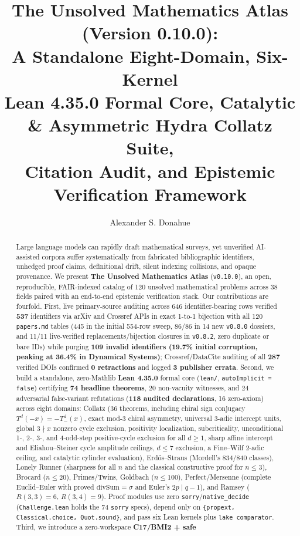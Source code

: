 \documentclass[11pt,reqno]{amsart}
\title[The Unsolved Mathematics Atlas (Version 0.10.0): Six-Kernel Formal Core \& Hydra]{%
  The Unsolved Mathematics Atlas (Version 0.10.0):\\
  A Standalone Eight-Domain, Six-Kernel\\
  Lean 4.35.0 Formal Core, Catalytic \& Asymmetric Hydra Collatz Suite,\\
  Citation Audit, and Epistemic Verification Framework}
\author{Alexander S. Donahue}
\theoremstyle{plain}
\theoremstyle{definition}
\newcommand{\code}[1]{{\upshape\nolinkurl{#1}}}
\begin{document}
\begin{abstract}
Large language models can rapidly draft mathematical surveys, yet unverified AI-assisted
corpora suffer systematically from fabricated bibliographic identifiers, unhedged proof claims,
definitional drift, silent indexing collisions, and opaque provenance. We present
\textbf{The Unsolved Mathematics Atlas} (\texttt{v0.10.0}), an open, reproducible, FAIR-indexed
catalog of 120 unsolved mathematical problems across 38 fields paired with an end-to-end
epistemic verification stack. Our contributions are fourfold.
First, live primary-source auditing across 646 identifier-bearing rows verified \textbf{537}
identifiers via arXiv and Crossref APIs in exact 1-to-1 bijection with all 120 \code{papers.md}
tables (445 in the initial 554-row sweep, 86/86 in 14 new \texttt{v0.8.0} dossiers, and 11/11
live-verified replacements/bijection closures in \texttt{v0.8.2}, zero duplicate or bare IDs)
while purging \textbf{109 invalid identifiers (19.7\% initial corruption, peaking at 36.4\% in
Dynamical Systems)}; Crossref/DataCite auditing of all \textbf{287} verified DOIs confirmed
\textbf{0 retractions} and logged \textbf{3 publisher errata}.
Second, we build a standalone, zero-Mathlib \textbf{Lean 4.35.0} formal core (\code{lean/},
\code{autoImplicit = false}) certifying \textbf{74 headline theorems}, 20 non-vacuity witnesses,
and 24 adversarial false-variant refutations (\textbf{118 audited declarations}, 16 zero-axiom)
across eight domains: Collatz (36 theorems, including chiral sign conjugacy
$T^d(-x) = -T_-^d(x)$, exact mod-3 chiral asymmetry, universal 3-adic intercept units, global
$3 \nmid x$ nonzero cycle exclusion, positivity localization, subcriticality, unconditional 1-,
2-, 3-, and 4-odd-step positive-cycle exclusion for all $d \ge 1$, sharp affine intercept and
Eliahou--Steiner cycle amplitude ceilings, $d \le 7$ exclusion, a Fine--Wilf 2-adic ceiling, and
catalytic cylinder evaluation), Erd\H{o}s--Straus (Mordell's 834/840 classes), Lonely Runner
(sharpness for all $n$ and the classical constructive proof for $n \le 3$), Brocard ($n \le 20$),
Primes/Twins, Goldbach ($n \le 100$), Perfect/Mersenne (complete Euclid--Euler with proved
$\mathrm{divSum}=\sigma$ and Euler's $2p \mid q-1$), and Ramsey ($R(3,3)=6$, $R(3,4)=9$). Proof
modules use zero \code{sorry}/\code{native_decide} (\code{Challenge.lean} holds the 74 \code{sorry}
specs), depend only on \texttt{\{propext, Classical.choice, Quot.sound\}}, and pass six Lean
kernels plus \code{lake comparator}. Third, we introduce a zero-workspace \textbf{C17/BMI2 + safe
}
\end{abstract}
\end{document}
